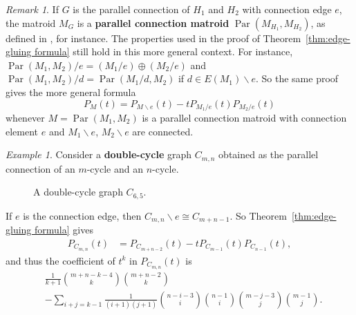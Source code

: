 \documentclass[12pt,reqno]{amsart}
\theoremstyle{definition}
\theoremstyle{remark}
\newtheorem{remark}[theorem]{Remark}
\newtheorem{example}[theorem]{Example}
\newcommand{\ssm}{\smallsetminus}
\renewcommand{\(}{\left(}
\renewcommand{\)}{\right)}
\newcommand{\<}{\left<}
\renewcommand{\>}{\right>}
\renewcommand{\setminus}{\smallsetminus}
\begin{document}
\newcommand{\Par}{\operatorname{Par}}
\begin{remark}
If $G$ is the parallel connection of $H_1$ and $H_2$ with connection edge $e$, the matroid $M_G$ is a \textbf{parallel connection matroid} $\Par(M_{H_1}, M_{H_2})$, as defined in \cite{B71}, for instance. 
The properties used in the proof of Theorem~\ref{thm:edge-gluing formula} still hold in this more general context.  For instance, $\Par(M_1,M_2)/e = (M_1/e) \oplus (M_2/e)$ and $\Par(M_1,M_2)/d = \Par(M_1/d,M_2)$ if $d \in E(M_1) \setminus e$.  So the same proof gives the more general formula
\[P_M(t) = P_{M\ssm e}(t) - tP_{M_1/e}(t)P_{M_2/e}(t)\]
whenever $M = \Par(M_1, M_2)$ is a parallel connection matroid with connection element $e$ and $M_1\ssm e$, $M_2\ssm e$ are connected.
\end{remark}

\begin{example}
Consider a \textbf{double-cycle} graph $C_{m,n}$ obtained as the parallel connection of an $m$-cycle and an $n$-cycle.  

\begin{figure}[!ht]
\centering
{}
\caption{A double-cycle graph $C_{6,5}$.}
\label{dcex}
\end{figure}

If $e$ is the connection edge, then $C_{m,n} \ssm e \cong C_{m+n-1}$.  So Theorem~\ref{thm:edge-gluing formula} gives
\begin{align*}
P_{C_{m,n}}(t) & = P_{C_{m+n-2}}(t) - tP_{C_{m-1}}(t)P_{C_{n-1}}(t),
\end{align*}
and thus the coefficient of $t^k$ in $P_{C_{m,n}}(t)$ is
\begin{align*}
& \frac{1}{k+1}\binom{m+n-k-4}{k}\binom{m+n-2}{k} \\ & - 
\sum_{i+j = k-1}\frac{1}{(i+1)(j+1)}\binom{n-i-3}{i}\binom{n-1}{i}\binom{m-j-3}{j}\binom{m-1}{j}.
\end{align*}
\end{example}
\end{document}
